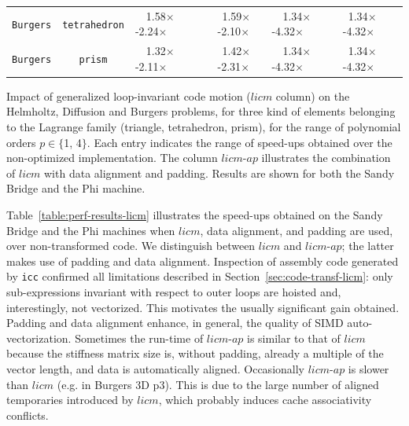 \documentclass[conference]{IEEEtran}
\begin{document}
{\begin{tabularx}{1.0\textwidth}{p{3.5cm}p{3.5cm}|p{2.25cm}p{2.25cm}p{2.25cm}p{2.25cm}|}
\multicolumn{1}{|c|}{\texttt{Burgers}} & \multicolumn{1}{c|}{\texttt{tetrahedron}} & ~~1.58$\times$-2.24$\times$ & \multicolumn{1}{c|}{~1.59$\times$-2.10$\times$} & ~~1.34$\times$-4.32$\times$ & ~1.34$\times$-4.32$\times$ \\
\multicolumn{1}{|c|}{\texttt{Burgers}} & \multicolumn{1}{c|}{\texttt{prism}} & ~~1.32$\times$-2.11$\times$ & \multicolumn{1}{c|}{~1.42$\times$-2.31$\times$} & ~~1.34$\times$-4.32$\times$ & ~1.34$\times$-4.32$\times$ \\
\cline{1-6}
\end{tabularx}
}

\begin{table}[t]\normalsize
\massmatrixtwodresultsnorms
\label{table:perf-results-licm}
\caption{Impact of generalized loop-invariant code motion ($licm$ column) on the Helmholtz, Diffusion and Burgers problems, for three kind of elements belonging to the Lagrange family (triangle, tetrahedron, prism), for the range of polynomial orders $p \in \lbrace$1, 4$\rbrace$. Each entry indicates the range of speed-ups obtained over the non-optimized implementation. The column $licm$-$ap$ illustrates the combination of $licm$ with data alignment and padding. Results are shown for both the Sandy Bridge and the Phi machine.}
\end{table}

Table~\ref{table:perf-results-licm} illustrates the speed-ups obtained on the Sandy Bridge and the Phi machines when $licm$, data alignment, and padding are used, over non-transformed code. We distinguish between $licm$ and $licm$-$ap$; the latter makes use of padding and data alignment. Inspection of assembly code generated by \texttt{icc} confirmed all limitations described in Section~\ref{sec:code-transf-licm}: only sub-expressions invariant with respect to outer loops are hoisted and, interestingly, not vectorized. This motivates the usually significant gain obtained. Padding and data alignment enhance, in general, the quality of SIMD auto-vectorization. Sometimes the run-time of $licm$-$ap$ is similar to that of $licm$ because the stiffness matrix size is, without padding, already a multiple of the vector length, and data is automatically aligned. Occasionally $licm$-$ap$ is slower than $licm$ (e.g. in Burgers 3D p3). This is due to the large number of aligned temporaries introduced by $licm$, which probably induces cache associativity conflicts. 
\end{document}

